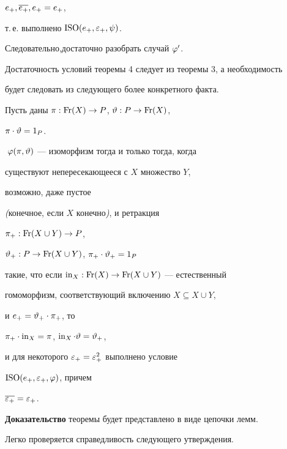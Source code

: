 $e_{+},\overline{e_{+}}, e_{+}=e_{+}$,


т.\,е. выполнено $ {\mathrm{ISO}}(e_{+},\varepsilon_{+},\psi)$.


Следовательно,достаточно разобрать случай $\varphi'$.


Достаточность условий теоремы 4 следует из теоремы 3, а необходимость


будет следовать из следующего более конкретного факта.





\begin{thm} Пусть даны $\pi : \operatorname{Fr}(X)\to P$, $ \vartheta : P\to \operatorname{Fr}(X)$,


$\pi\cdot \vartheta =1_P$.


$\;\varphi(\pi,\vartheta)$ --- изоморфизм тогда и только тогда, когда


существуют непересекающееся с $X$ множество $Y$,


возможно, даже пустое


{\em (}конечное, если $X$ конечно{\em )}, и ретракция


$\pi_{+} : \operatorname{Fr}(X\cup Y)\to P$,


$\vartheta_{+}: P\to \operatorname{Fr}(X\cup Y)$, $\pi_{+}\cdot\vartheta_{+}=1_P$


такие, что если $\operatorname{in}_X: \operatorname{Fr}(X)\to \operatorname{Fr}(X\cup Y)$ --- естественный


гомоморфизм, соответствующий включению $X\subseteq X\cup Y$,


и $e_{+}=\vartheta_{+}\cdot\pi_{+}$, то


$\pi_{+}\cdot \operatorname{in}_X=\pi $, $\operatorname{in}_X\cdot\vartheta=\vartheta_{+}$,


и для некоторого $\varepsilon_{+}=\varepsilon_{+}^2$ выполнено условие


${\mathrm{ISO}}(e_{+},\varepsilon_{+},\varphi)$, причем


$\overline{\varepsilon_{+}}=\varepsilon_{+}$.


\end{thm}





{\bf Доказательство} теоремы будет представлено в виде цепочки лемм.


Легко проверяется справедливость следующего утверждения.





